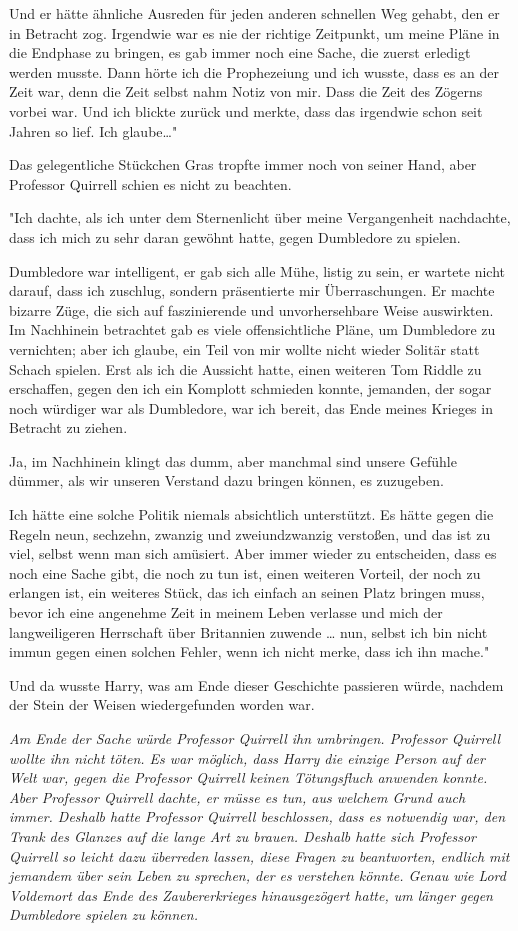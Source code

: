 {Und er hätte ähnliche Ausreden für jeden anderen schnellen Weg gehabt, den er in Betracht zog. Irgendwie war es nie der richtige Zeitpunkt, um meine Pläne in die Endphase zu bringen, es gab immer noch eine Sache, die zuerst erledigt werden musste. Dann hörte ich die Prophezeiung und ich wusste, dass es an der Zeit war, denn die Zeit selbst nahm Notiz von mir. Dass die Zeit des Zögerns vorbei war. Und ich blickte zurück und merkte, dass das irgendwie schon seit Jahren so lief. Ich glaube…"

Das gelegentliche Stückchen Gras tropfte immer noch von seiner Hand, aber Professor Quirrell schien es nicht zu beachten.

"Ich dachte, als ich unter dem Sternenlicht über meine Vergangenheit nachdachte, dass ich mich zu sehr daran gewöhnt hatte, gegen Dumbledore zu spielen.

Dumbledore war intelligent, er gab sich alle Mühe, listig zu sein, er wartete nicht darauf, dass ich zuschlug, sondern präsentierte mir Überraschungen. Er machte bizarre Züge, die sich auf faszinierende und unvorhersehbare Weise auswirkten. Im Nachhinein betrachtet gab es viele offensichtliche Pläne, um Dumbledore zu vernichten; aber ich glaube, ein Teil von mir wollte nicht wieder Solitär statt Schach spielen. Erst als ich die Aussicht hatte, einen weiteren Tom Riddle zu erschaffen, gegen den ich ein Komplott schmieden konnte, jemanden, der sogar noch würdiger war als Dumbledore, war ich bereit, das Ende meines Krieges in Betracht zu ziehen.

Ja, im Nachhinein klingt das dumm, aber manchmal sind unsere Gefühle dümmer, als wir unseren Verstand dazu bringen können, es zuzugeben.

Ich hätte eine solche Politik niemals absichtlich unterstützt. Es hätte gegen die Regeln neun, sechzehn, zwanzig und zweiundzwanzig verstoßen, und das ist zu viel, selbst wenn man sich amüsiert. Aber immer wieder zu entscheiden, dass es noch eine Sache gibt, die noch zu tun ist, einen weiteren Vorteil, der noch zu erlangen ist, ein weiteres Stück, das ich einfach an seinen Platz bringen muss, bevor ich eine angenehme Zeit in meinem Leben verlasse und mich der langweiligeren Herrschaft über Britannien zuwende … nun, selbst ich bin nicht immun gegen einen solchen Fehler, wenn ich nicht merke, dass ich ihn mache."

Und da wusste Harry, was am Ende dieser Geschichte passieren würde, nachdem der Stein der Weisen wiedergefunden worden war.

\emph{Am Ende der Sache würde Professor Quirrell ihn umbringen. Professor Quirrell wollte ihn nicht töten. Es war möglich, dass Harry die einzige Person auf der Welt war, gegen die Professor Quirrell keinen Tötungsfluch anwenden konnte. Aber Professor Quirrell dachte, er müsse es tun, aus welchem Grund auch immer. Deshalb hatte Professor Quirrell beschlossen, dass es notwendig war, den Trank des Glanzes auf die lange Art zu brauen. Deshalb hatte sich Professor Quirrell so leicht dazu überreden lassen, diese Fragen zu beantworten, endlich mit jemandem über sein Leben zu sprechen, der es verstehen könnte. Genau wie Lord Voldemort das Ende des Zaubererkrieges hinausgezögert hatte, um länger gegen Dumbledore spielen zu können.}

}
